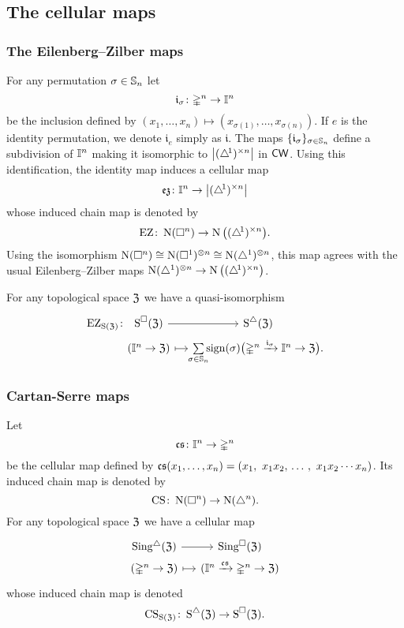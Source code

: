 \subsection{The cellular maps} \label{ss:comparison collapse map}

\subsubsection{The Eilenberg--Zilber maps}

For any permutation $\sigma \in \Sym_n$ let
\[
\gi_\sigma \colon \gsimplex^n \to \gcube^n
\]
be the inclusion defined by $(x_1, \dots, x_n) \mapsto (x_{\sigma(1)}, \dots, x_{\sigma(n)})$.
If $e$ is the identity permutation, we denote $\mathfrak{i}_{e}$ simply as $\mathfrak{i}$.
The maps $\set{\mathfrak{i}_\sigma}_{\sigma \in \Sym_n}$ define a subdivision of $\gcube^n$ making it isomorphic to $\bars[\big]{\scube{n}}$ in $\CW$.
Using this identification, the identity map induces a cellular map
\[
\ez \colon \gcube^n \to \bars[\big]{\scube{n}}
\]
whose induced chain map is denoted by
\[
\EZ \colon \chains(\cube^n) \to \chains \big( \scube{n} \big).
\]
Using the isomorphism $\chains(\cube^n) \cong \chains(\cube^1)^{\ot n} \cong \chains(\simplex^1)^{\ot n}$, this map agrees with the usual Eilenberg--Zilber maps $\chains(\simplex^1)^{\ot n} \to \chains \big( \scube{n} \big)$.

For any topological space $\fZ$ we have a quasi-isomorphism
\begin{equation} \label{e:ezz}
	\begin{tikzcd} [column sep=small, row sep=0]
		\EZ_{\Schains(\fZ)} \colon &[-20pt] \cSchains(\fZ) \arrow[r] & \sSchains (\fZ) \\
		& (\gcube^n \to \fZ) \arrow[r, mapsto] &
		\sum\limits_{\mathclap{\sigma \in \Sym_n}} \sign(\sigma) \big( \gsimplex^n \xra{\gi_\sigma} \gcube^n \to \fZ \big).
	\end{tikzcd}
\end{equation}

\subsubsection{Cartan-Serre maps}

Let
\[
\cs \colon \gcube^n \to \gsimplex^n
\]
be the cellular map defined by $\cs(x_1, \dots, x_n) = (x_1,\ x_1 x_2, \, \dots \, , \ x_1 x_2 \dotsm x_n)$.
Its induced chain map is denoted by
\[
\CS \colon \chains(\cube^n) \to \chains(\simplex^n).
\]
For any topological space $\fZ$ we have a cellular map
\[
\begin{tikzcd} [column sep=small, row sep=0]
	\sSing(\fZ) \arrow[r] & \cSing (\fZ) \\
	(\gsimplex^n \to \fZ) \arrow[r, mapsto] & (\gcube^n \xra{\cs} \gsimplex^n \to \fZ)
\end{tikzcd}
\]
whose induced chain map is denoted
\[
\CS_{\Schains(\fZ)} \colon \sSchains(\fZ) \to \cSchains(\fZ).
\]

